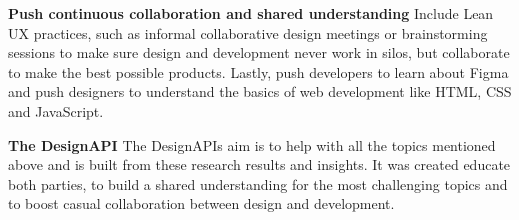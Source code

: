 \textbf{Push continuous collaboration and shared understanding}
Include Lean UX practices, such as informal collaborative design meetings or brainstorming sessions
to make sure design and development never work in silos, but collaborate to make the best possible
products. Lastly, push developers to learn about Figma and push designers to understand the basics
of web development like HTML, CSS and JavaScript.

\textbf{The DesignAPI}
The DesignAPIs aim is to help with all the topics mentioned above and is built from these research
results and insights. It was created educate both parties, to build a shared understanding for the
most challenging topics and to boost casual collaboration between design and development.
